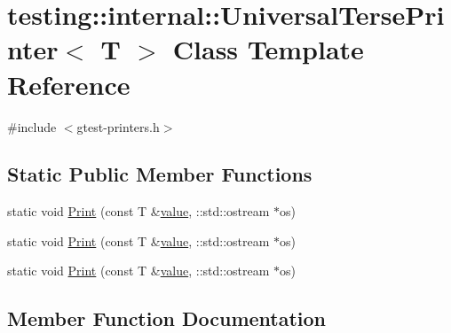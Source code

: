 \hypertarget{classtesting_1_1internal_1_1_universal_terse_printer}{}\section{testing\+::internal\+::Universal\+Terse\+Printer$<$ T $>$ Class Template Reference}
\label{classtesting_1_1internal_1_1_universal_terse_printer}


{\ttfamily \#include $<$gtest-\/printers.\+h$>$}

\subsection*{Static Public Member Functions}
\begin{DoxyCompactItemize}
\item 
static void \mbox{\hyperlink{classtesting_1_1internal_1_1_universal_terse_printer_a042249cdb42fdb77588c9ad54ea7ed54}{Print}} (const T \&\mbox{\hyperlink{_obj__test_2lib_2googletest-master_2googlemock_2test_2gmock-matchers__test_8cc_a337b8a670efc0b086ad3af163f3121b6}{value}}, \+::std\+::ostream $\ast$os)
\item 
static void \mbox{\hyperlink{classtesting_1_1internal_1_1_universal_terse_printer_a042249cdb42fdb77588c9ad54ea7ed54}{Print}} (const T \&\mbox{\hyperlink{_obj__test_2lib_2googletest-master_2googlemock_2test_2gmock-matchers__test_8cc_a337b8a670efc0b086ad3af163f3121b6}{value}}, \+::std\+::ostream $\ast$os)
\item 
static void \mbox{\hyperlink{classtesting_1_1internal_1_1_universal_terse_printer_a042249cdb42fdb77588c9ad54ea7ed54}{Print}} (const T \&\mbox{\hyperlink{_obj__test_2lib_2googletest-master_2googlemock_2test_2gmock-matchers__test_8cc_a337b8a670efc0b086ad3af163f3121b6}{value}}, \+::std\+::ostream $\ast$os)
\end{DoxyCompactItemize}


\subsection{Member Function Documentation}
\mbox{\label{classtesting_1_1internal_1_1_universal_terse_printer_a042249cdb42fdb77588c9ad54ea7ed54}} 
